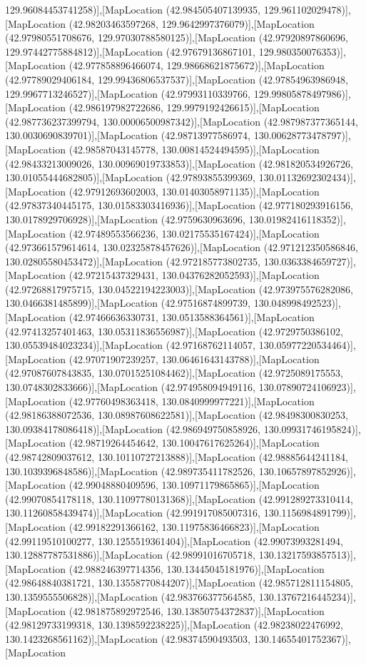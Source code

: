 129.96084453741258)],[MapLocation (42.984505407139935, 129.961102029478)],[MapLocation (42.98203463597268, 129.9642997376079)],[MapLocation (42.97980551708676, 129.97030788580125)],[MapLocation (42.97920897860696, 129.97442775884812)],[MapLocation (42.97679136867101, 129.980350076353)],[MapLocation (42.977858896466074, 129.98668621875672)],[MapLocation (42.97789029406184, 129.99436806537537)],[MapLocation (42.97854963986948, 129.9967713246527)],[MapLocation (42.97993110339766, 129.99805878497986)],[MapLocation (42.986197982722686, 129.9979192426615)],[MapLocation (42.987736237399794, 130.00006500987342)],[MapLocation (42.987987377365144, 130.0030690839701)],[MapLocation (42.98713977586974, 130.00628773478797)],[MapLocation (42.98587043145778, 130.00814524494595)],[MapLocation (42.98433213009026, 130.00969019733853)],[MapLocation (42.981820534926726, 130.01055444682805)],[MapLocation (42.97893855399369, 130.01132692302434)],[MapLocation (42.97912693602003, 130.01403058971135)],[MapLocation (42.97837340445175, 130.01583303416936)],[MapLocation (42.977180293916156, 130.0178929706928)],[MapLocation (42.9759630963696, 130.01982416118352)],[MapLocation (42.97489553566236, 130.02175535167424)],[MapLocation (42.973661579614614, 130.02325878457626)],[MapLocation (42.971212350586846, 130.02805580453472)],[MapLocation (42.972185773802735, 130.0363384659727)],[MapLocation (42.97215437329431, 130.04376282052593)],[MapLocation (42.97268817975715, 130.04522194223003)],[MapLocation (42.973975576282086, 130.0466381485899)],[MapLocation (42.97516874899739, 130.048998492523)],[MapLocation (42.97466636330731, 130.0513588364561)],[MapLocation (42.97413257401463, 130.05311836556987)],[MapLocation (42.9729750386102, 130.05539484023234)],[MapLocation (42.97168762114057, 130.05977220534464)],[MapLocation (42.97071907239257, 130.06461643143788)],[MapLocation (42.97087607843835, 130.07015251084462)],[MapLocation (42.9725089175553, 130.0748302833666)],[MapLocation (42.974958094949116, 130.07890724106923)],[MapLocation (42.97760498363418, 130.0840999977221)],[MapLocation (42.98186388072536, 130.08987608622581)],[MapLocation (42.98498300830253, 130.09384178086418)],[MapLocation (42.986949750858926, 130.09931746195824)],[MapLocation (42.98719264454642, 130.10047617625264)],[MapLocation (42.98742809037612, 130.10110727213888)],[MapLocation (42.98885644241184, 130.1039396848586)],[MapLocation (42.989735411782526, 130.10657897852926)],[MapLocation (42.99048880409596, 130.10971179865865)],[MapLocation (42.99070854178118, 130.11097780131368)],[MapLocation (42.991289273310414, 130.11260858439474)],[MapLocation (42.991917085007316, 130.1156984891799)],[MapLocation (42.99182291366162, 130.11975836466823)],[MapLocation (42.99119510100277, 130.1255519361404)],[MapLocation (42.99073993281494, 130.12887787531886)],[MapLocation (42.98991016705718, 130.13217593857513)],[MapLocation (42.988246397714356, 130.13445045181976)],[MapLocation (42.98648840381721, 130.13558770844207)],[MapLocation (42.985712811154805, 130.1359555506828)],[MapLocation (42.983766377564585, 130.13767216445234)],[MapLocation (42.981875892972546, 130.13850754372837)],[MapLocation (42.98129733199318, 130.1398592238225)],[MapLocation (42.98238022476992, 130.1423268561162)],[MapLocation (42.98374590493503, 130.14655401752367)],[MapLocation 